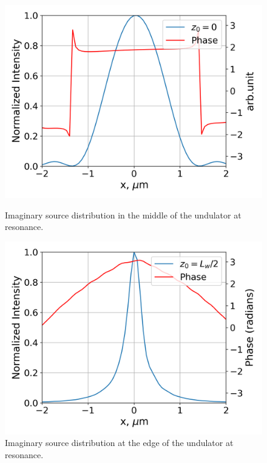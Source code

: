     \begin{figure}[h!]
        \centering
        \begin{minipage}{0.48\linewidth}  %
            \includegraphics[width=\linewidth]{content/images/Synchrotron_Radiation/intensity_scan_N_w_100_phase_study_cross_middle.png}
            \captionsetup{justification=centering}
            \caption{Imaginary source distribution in the middle of the undulator at resonance.}  %
            \label{Fig:middle_scan}  %
        \end{minipage}
        \hfill  %
        \begin{minipage}{0.48\linewidth}
            \includegraphics[width=\linewidth]{content/images/Synchrotron_Radiation/intensity_scan_N_w_100_phase_study_cross_end.png}
            \captionsetup{justification=centering}
            \caption{Imaginary source distribution at the edge of the undulator at resonance.}  %
            \label{Fig:end_scan}  %
        \end{minipage}
    \end{figure}        

